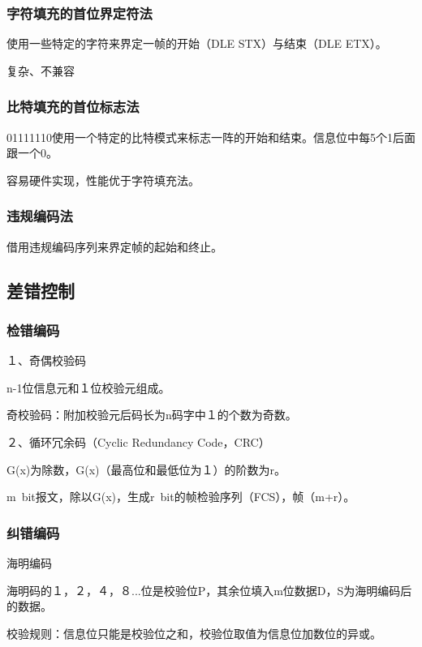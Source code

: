\documentclass{ctexart}
\begin{document}
\subsubsection{字符填充的首位界定符法}

使用一些特定的字符来界定一帧的开始（DLE STX）与结束（DLE ETX）。

复杂、不兼容

\subsubsection{比特填充的首位标志法}

01111110使用一个特定的比特模式来标志一阵的开始和结束。信息位中每5个1后面跟一个0。

容易硬件实现，性能优于字符填充法。

\subsubsection{违规编码法}

借用违规编码序列来界定帧的起始和终止。

\subsection{差错控制}

\subsubsection{检错编码}

１、奇偶校验码

n-1位信息元和１位校验元组成。

奇校验码：附加校验元后码长为n码字中１的个数为奇数。

２、循环冗余码（Cyclic Redundancy Code，CRC）

G(x)为除数，G(x)（最高位和最低位为１）的阶数为r。

m~bit报文，除以G(x)，生成r~bit的帧检验序列（FCS），帧（m+r）。


\subsubsection{纠错编码}

海明编码

海明码的１，２，４，８...位是校验位P，其余位填入m位数据D，S为海明编码后的数据。

校验规则：信息位只能是校验位之和，校验位取值为信息位加数位的异或。
\end{document}
